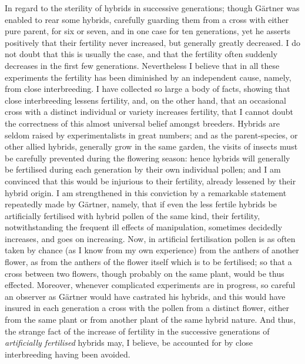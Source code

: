 \indent In regard to the sterility of hybrids in successive generations; though G\"{a}rtner was enabled to rear some hybrids, carefully guarding them from a cross with either pure parent, for six or seven, and in one case for ten generations, yet he asserts positively that their fertility never increased, but generally greatly decreased. I do not doubt that this is usually the case, and that the fertility often suddenly decreases in the first few generations. Nevertheless I believe that in all these experiments the fertility has been diminished by an independent cause, namely, from close interbreeding. I have collected so large a body of facts, showing that close interbreeding lessens fertility, and, on the other hand, that an occasional cross with a distinct individual or variety increases fertility, that I cannot doubt the correctness of this almost universal belief amongst breeders. Hybrids are seldom raised by experimentalists in great numbers; and as the parent-species, or other allied hybrids, generally grow in the same garden, the visits of insects must be carefully prevented during the flowering season: hence hybrids will generally be fertilised during each generation by their own individual pollen; and I am convinced that this would be injurious to their fertility, already lessened by their hybrid origin. I am strengthened in this conviction by a remarkable statement repeatedly made by G\"{a}rtner, namely, that if even the less fertile hybrids be artificially fertilised with hybrid pollen of the same kind, their fertility, notwithstanding the frequent ill effects of manipulation, sometimes decidedly increases, and goes on increasing. Now, in artificial fertilisation pollen is as often taken by chance (as I know from my own experience) from the anthers of another flower, as from the anthers of the flower itself which is to be fertilised; so that a cross between two flowers, though probably on the same plant, would be thus effected. Moreover, whenever complicated experiments are in progress, so careful an observer as G\"{a}rtner would have castrated his hybrids, and this would have insured in each generation a cross with the pollen from a distinct flower, either from the same plant or from another plant of the same hybrid nature. And thus, the strange fact of the increase of fertility in the successive generations of \emph{artificially fertilised} hybrids may, I believe, be accounted for by close interbreeding having been avoided.\\
